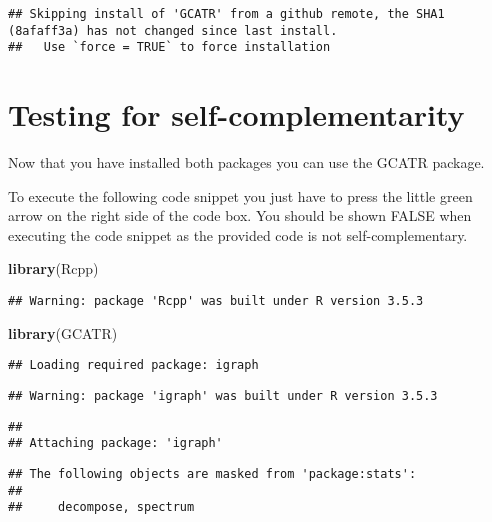 \documentclass[
]{article}
\newenvironment{Shaded}{\begin{snugshade}}{\end{snugshade}}
\newcommand{\KeywordTok}[1]{\textcolor[rgb]{0.13,0.29,0.53}{\textbf{#1}}}
\newcommand{\NormalTok}[1]{#1}
\begin{document}
\begin{verbatim}
## Skipping install of 'GCATR' from a github remote, the SHA1 (8afaff3a) has not changed since last install.
##   Use `force = TRUE` to force installation
\end{verbatim}

\hypertarget{self-complementary}{%
\section{Testing for self-complementarity}\label{self-complementary}}

Now that you have installed both packages you can use the GCATR package.

To execute the following code snippet you just have to press the little
green arrow on the right side of the code box. You should be shown FALSE
when executing the code snippet as the provided code is not
self-complementary.

\begin{Shaded}
\begin{Highlighting}[]
\KeywordTok{library}\NormalTok{(Rcpp)}
\end{Highlighting}
\end{Shaded}

\begin{verbatim}
## Warning: package 'Rcpp' was built under R version 3.5.3
\end{verbatim}

\begin{Shaded}
\begin{Highlighting}[]
\KeywordTok{library}\NormalTok{(GCATR)}
\end{Highlighting}
\end{Shaded}

\begin{verbatim}
## Loading required package: igraph
\end{verbatim}

\begin{verbatim}
## Warning: package 'igraph' was built under R version 3.5.3
\end{verbatim}

\begin{verbatim}
## 
## Attaching package: 'igraph'
\end{verbatim}

\begin{verbatim}
## The following objects are masked from 'package:stats':
## 
##     decompose, spectrum
\end{verbatim}
\end{document}
